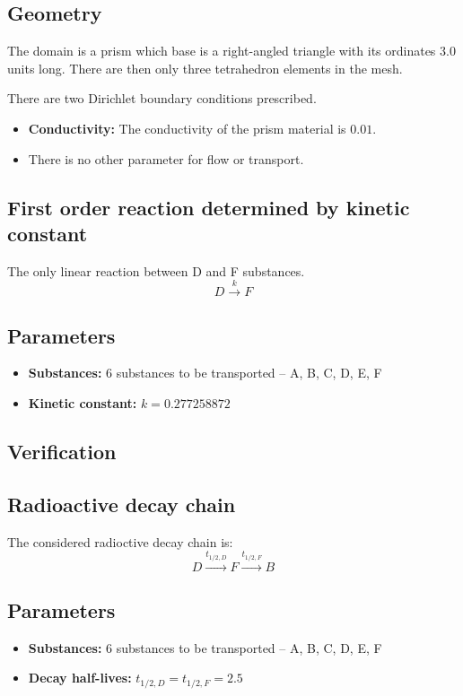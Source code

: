 \subsection*{Geometry}
The domain is a prism which base is a right-angled triangle with its ordinates 3.0 units long. There are then only three tetrahedron elements in the mesh.

There are two Dirichlet boundary conditions prescribed.

\begin{itemize}
  \item \textbf{Conductivity:} The conductivity of the prism material is $0.01$. 
  \item There is no other parameter for flow or transport.
\end{itemize}


 
\subsection{First order reaction determined by kinetic constant}
The only linear reaction between D and F substances.
\[
D\xrightarrow{k}F
\]

\subsection*{Parameters}
\begin{itemize}
  \item \textbf{Substances:} 6 substances to be transported -- A, B, C, D, E, F
  \item \textbf{Kinetic constant:} $k = 0.277258872$
\end{itemize}

\subsection*{Verification}

\subsection{Radioactive decay chain}
The considered radioctive decay chain is:
\[
 D\xrightarrow{t_{1/2,D}}F\xrightarrow{t_{1/2,F}}B
\]
\subsection*{Parameters}
\begin{itemize}
  \item \textbf{Substances:} 6 substances to be transported -- A, B, C, D, E, F
  \item \textbf{Decay half-lives:} $t_{1/2,D} = t_{1/2,F} = 2.5$
\end{itemize}

